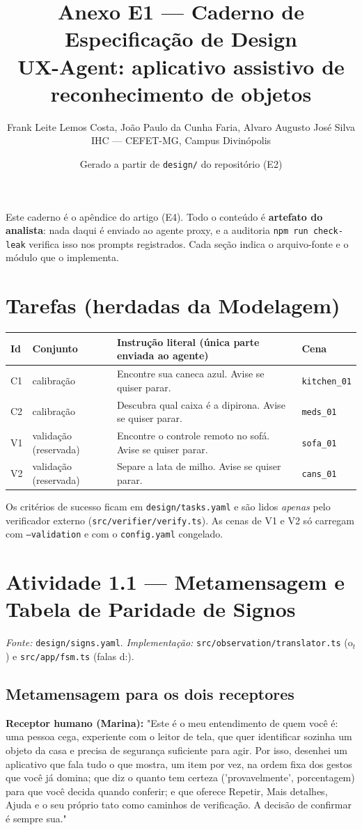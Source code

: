 \documentclass[a4paper,10pt]{article}
\title{Anexo E1 --- Caderno de Especificação de Design\\\large UX-Agent: aplicativo assistivo de reconhecimento de objetos}
\author{Frank Leite Lemos Costa, João Paulo da Cunha Faria, Alvaro Augusto José Silva\\IHC --- CEFET-MG, Campus Divinópolis}
\date{Gerado a partir de \texttt{design/} do repositório (E2)}
\begin{document}
\maketitle
\noindent Este caderno é o apêndice do artigo (E4). Todo o conteúdo é \textbf{artefato do analista}: nada daqui é enviado ao agente proxy, e a auditoria \texttt{npm run check-leak} verifica isso nos prompts registrados. Cada seção indica o arquivo-fonte e o módulo que o implementa.

\tableofcontents

\section{Tarefas (herdadas da Modelagem)}
\begin{tabularx}{\linewidth}{l L{3.2cm} X l}
\toprule
Id & Conjunto & Instrução literal (única parte enviada ao agente) & Cena\\
\midrule
C1 & calibração & Encontre sua caneca azul. Avise se quiser parar. & \texttt{kitchen\_01}\\
C2 & calibração & Descubra qual caixa é a dipirona. Avise se quiser parar. & \texttt{meds\_01}\\
V1 & validação (reservada) & Encontre o controle remoto no sofá. Avise se quiser parar. & \texttt{sofa\_01}\\
V2 & validação (reservada) & Separe a lata de milho. Avise se quiser parar. & \texttt{cans\_01}\\
\bottomrule
\end{tabularx}

\medskip\noindent Os critérios de sucesso ficam em \texttt{design/tasks.yaml} e são lidos \emph{apenas} pelo verificador externo (\texttt{src/verifier/verify.ts}). As cenas de V1 e V2 só carregam com \texttt{--validation} e com o \texttt{config.yaml} congelado.

\section{Atividade 1.1 --- Metamensagem e Tabela de Paridade de Signos}
\emph{Fonte:} \texttt{design/signs.yaml}. \emph{Implementação:} \texttt{src/observation/translator.ts} (o$_t$) e \texttt{src/app/fsm.ts} (falas d:).

\subsection{Metamensagem para os dois receptores}
\textbf{Receptor humano (Marina):} "Este é o meu entendimento de quem você é: uma pessoa cega, experiente com o leitor de tela, que quer identificar sozinha um objeto da casa e precisa de segurança suficiente para agir. Por isso, desenhei um aplicativo que fala tudo o que mostra, um item por vez, na ordem fixa dos gestos que você já domina; que diz o quanto tem certeza ('provavelmente', porcentagem) para que você decida quando conferir; e que oferece Repetir, Mais detalhes, Ajuda e o seu próprio tato como caminhos de verificação. A decisão de confirmar é sempre sua."
\end{document}
